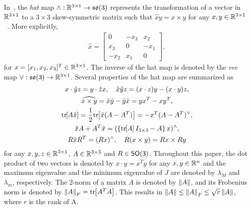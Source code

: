 \documentclass[letterpaper, 10 pt, conference]{ieeeconf}  %
\begin{document}
In~, the \textit{hat} map $\wedge :\mathbb{R}^{3\times1}\rightarrow\mathfrak{so}(3)$ represents the transformation of a vector in $\mathbb{R}^{3\times1}$ to a $3\times 3$ skew-symmetric matrix such that $\hat x y = x\times y$ for any $x,y\in\mathbb{R}^{3\times1}$~\cite{bullo2004}. 
More explicitly, 
\begin{align*}
\hat x = \begin{bmatrix} 0 & -x_3 & x_2 \\ x_3 & 0 & -x_1 \\ -x_2 & x_1 & 0\end{bmatrix},
\end{align*}
for $x=[x_1,x_2,x_3]^T\in\mathbb{R}^{3\times1}$. 
The inverse of the hat map is denoted by the \textit{vee} map $\vee:\mathfrak{so}(3)\rightarrow\mathbb{R}^{3\times1}$. 
Several properties of the hat map are summarized as
\begin{gather}
    x\cdot \hat y z = y\cdot \hat z x,\quad \hat x\hat y z = (x\cdot z) y - (x\cdot y ) z\label{eqn:STP},\\
    \widehat{x\times y} = \hat x \hat y -\hat y \hat x = yx^T-xy^T,\label{eqn:hatxy}\\
    \mathrm{tr}\negthickspace\left[ A\hat x  \right]=\frac{1}{2}\mathrm{tr}\negthickspace\left[ \hat x (A-A^T) \right]=-x^T (A-A^T)^\vee,\label{eqn:hat1}\\
    \hat x  A+A^T\hat x=(\left\{ \mathrm{tr}\negthickspace\left[ A \right]I_{3\times 3}-A \right\}x)^{\wedge},\label{eqn:xAAx}\\
R\hat x R^T = (Rx)^\wedge,\quad 
R(x\times y) = Rx\times Ry\label{eqn:RxR}
\end{gather}
for any $x,y,z\in\mathbb{R}^{3\times1}$, $A\in\mathbb{R}^{3\times 3}$ and $R\in\mathsf{SO(3)}$. 
Throughout this paper, the dot product of two vectors is denoted by $x\cdot y = x^T y$ for any $x,y\in\mathbb{R}^n$ and the maximum eigenvalue and the minimum eigenvalue of $J$ are denoted by $\lambda_M$ and $\lambda_m$, respectively. 
The 2-norm of a matrix \( A \) is denoted by \( \left\| A \right\| \), and its Frobenius norm is denoted by \( \left\| A \right\|_F = \mathrm{tr}\negthickspace\left[ A^T A \right] \).
This results in \( \left\| A \right\| \leq \left\| A \right\|_F \leq \sqrt{r}\left\| A \right\| \), where \( r \) is the rank of A.
\end{document}
